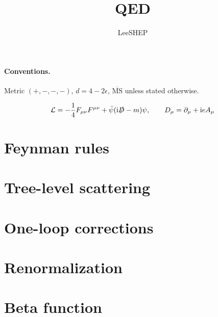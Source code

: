 \documentclass[11pt]{article}
\title{QED}
\author{LeeSHEP}
\date{}
\begin{document}
\maketitle

\paragraph{Conventions.} Metric $(+,-,-,-)$, $d = 4 - 2\epsilon$, $\overline{\text{MS}}$ unless stated otherwise.

\begin{equation}
  \mathcal{L} = -\frac{1}{4}F_{\mu\nu}F^{\mu\nu} + \bar\psi(\mathrm{i}\slashed{D} - m)\psi, \qquad D_\mu = \partial_\mu + \mathrm{i} e A_\mu
\end{equation}

\section{Feynman rules}
\section{Tree-level scattering}
\section{One-loop corrections}
\section{Renormalization}
\section{Beta function}
\end{document}
